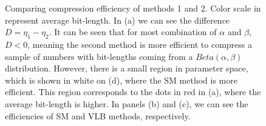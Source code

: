 \documentclass[10pt]{article}
\begin{document}
\begin{figure}[h]
{   }
  \caption{Comparing compression efficiency of methods 1 and 2. Color scale in 
represent average bit-length. In (a) we can see the difference $D = \eta_1 - 
\eta_2$. It can be seen that for most combination of $\alpha$ and $\beta$, 
$D<0$, meaning the second method is more efficient to compress a sample of 
numbers with bit-lengths coming from a $Beta(\alpha,\beta)$ distribution. 
However, there is a small region in parameter space, which is shown in white on 
(d), where the SM method is more efficient. This region corresponds to the dots 
in red in (a), where the average bit-length is higher. In panels (b) and (c), we 
can see the efficiencies of SM and VLB methods, respectively.}
  \label{fig:06070809}
\end{figure}
\end{document}
